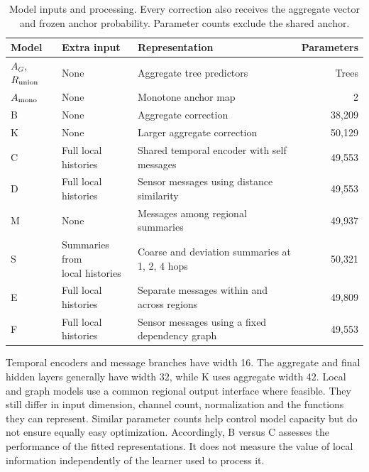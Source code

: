 \documentclass{llncs}
\begin{document}
\begin{table}[t]
\caption{Model inputs and processing. Every correction also receives the aggregate vector and frozen anchor probability. Parameter counts exclude the shared anchor.}
\label{tab:inputs}
\small
\begin{tabularx}{\textwidth}{l l >{\raggedright\arraybackslash}X r}
\toprule
Model & Extra input & Representation & Parameters\\
\midrule
$A_G$, $R_{\rm union}$ & None & Aggregate tree predictors & Trees\\
$A_{\rm mono}$ & None & Monotone anchor map & 2\\
B & None & Aggregate correction & 38,209\\
K & None & Larger aggregate correction & 50,129\\
C & Full local histories & Shared temporal encoder with self messages & 49,553\\
D & Full local histories & Sensor messages using distance similarity & 49,553\\
M & None & Messages among regional summaries & 49,937\\
S & \shortstack[l]{Summaries from\\local histories} & Coarse and deviation summaries at 1, 2, 4 hops & 50,321\\
E & Full local histories & Separate messages within and across regions & 49,809\\
F & Full local histories & Sensor messages using a fixed dependency graph & 49,553\\
\bottomrule
\end{tabularx}
\end{table}

Temporal encoders and message branches have width 16. The aggregate and final hidden layers generally have width 32, while K uses aggregate width 42. Local and graph models use a common regional output interface where feasible. They still differ in input dimension, channel count, normalization and the functions they can represent. Similar parameter counts help control model capacity but do not ensure equally easy optimization. Accordingly, B versus C assesses the performance of the fitted representations. It does not measure the value of local information independently of the learner used to process it.
\end{document}
